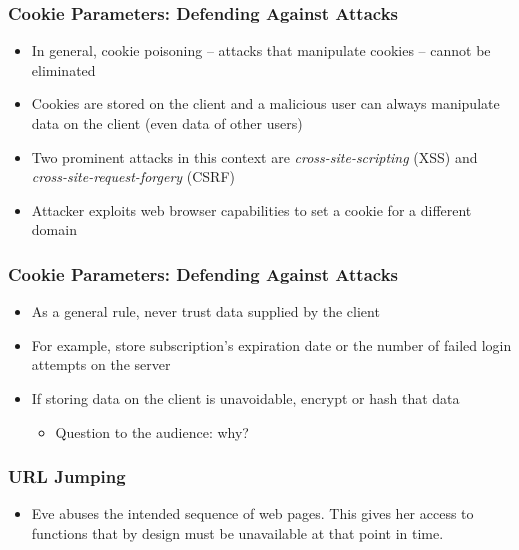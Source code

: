 \begin{frame}
    \frametitle{Cookie Parameters: Defending Against Attacks}
    \begin{itemize}
        \item In general, cookie poisoning -- attacks that manipulate cookies -- cannot be eliminated
        \item Cookies are stored on the client and a malicious user can always manipulate data on the client (even data of other users)
        \item Two prominent attacks in this context are \textit{cross-site-scripting} (XSS) and \textit{cross-site-request-forgery} (CSRF)
        \item Attacker exploits web browser capabilities to set a cookie for a different domain
    \end{itemize}
\end{frame}

\begin{frame}
    \frametitle{Cookie Parameters: Defending Against Attacks}
    \begin{itemize}
        \item As a general rule, never trust data supplied by the client
        \item For example, store subscription's expiration date or the number of failed login attempts on the server
        \item If storing data on the client is unavoidable, encrypt or hash that data
        \begin{itemize}
            \item Question to the audience: why?
        \end{itemize} 
    \end{itemize}
\end{frame}

\begin{frame}
    \frametitle{URL Jumping}
    \begin{itemize}
        \item Eve abuses the intended sequence of web pages. This gives her access to functions that by design must be unavailable at that point in time. 
    \end{itemize}
\end{frame}

